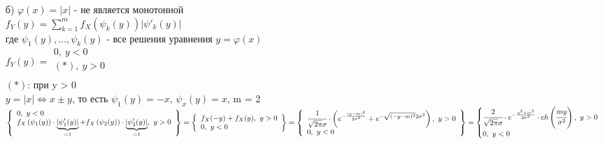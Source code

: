 \begin{enumerate}
	\item[б)]
	$\varphi(x) = |x|$ - не является монотонной\\
	$f_Y(y) = \sum\limits_{k = 1}^m f_X \left(\psi_k(y)\right) |\psi'_k(y)|$\\
	где $\psi_1(y), \ldots, \psi_k(y)$ - все решения уравнения $y = \varphi(x)$\\
	$f_Y(y) = 
	\begin{array}{lll}
		0, \ y < 0\\
		(*), \ y > 0\\
	\end{array}$ \fbox{=}\\
	$(*)$: при y > 0\\
	$y = |x| \Leftrightarrow x \pm y$, то есть $\psi_1(y) = -x$, $\psi_x(y) = x$, m = 2\\
	\fbox{=} $\left\{
	\begin{array}{lll}
		0, \ y < 0\\
		f_X \left(\psi_1(y)\right) \cdot \underbrace{|\psi_1'(y)|}_{= 1} + f_X \left(\psi_2(y)\right) \cdot \underbrace{|\psi_2'(y)|}_{= 1}, \ y > 0\\
	\end{array} \right\} = \left\{
	\begin{array}{lll}
		f_X(-y) + f_X(y), \ y > 0\\
		0, \ y < 0\\
	\end{array} \right\} = \left\{
	\begin{array}{lll}
		\cfrac{1}{\sqrt{2 \pi} \sigma} \cdot \left(e^{- \frac{(y - m)^2}{2 \sigma^2}} + e^{- \sqrt{(- y - m)^2}{2 \sigma^2}} \right), \ y > 0\\
		0, \ y < 0\\
	\end{array} \right\} = 
	\begin{cases}
		\cfrac{2}{\sqrt{2 \pi} \sigma} \cdot e^{- \frac{y^2 + m^2}{2 \sigma^2}} \cdot ch\left(\cfrac{my}{\sigma^2}\right), \ y > 0\\
		0, \ y < 0\\
	\end{cases}$\\
\end{enumerate}































